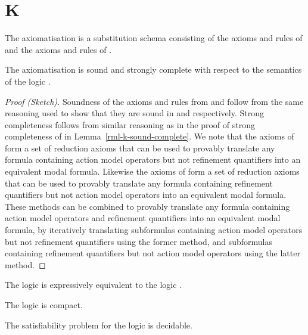 \section{K}

\begin{definition}
The axiomatisation \axiomAamlK{} is a substitution schema consisting of the axioms and rules of \axiomAmlK{} and the axioms and rules of \axiomRmlK{}.
\end{definition}

\begin{theorem}\label{aaml-k-sound-complete}
The axiomatisation \axiomRmlK{} is sound and strongly complete with respect to the semantics of the logic \logicAamlK{}.
\end{theorem}

\begin{proof}[Proof (Sketch)]
Soundness of the axioms and rules from \axiomAmlK{} and \axiomRmlK{} follow from the same reasoning used to show that they are sound in \logicAmlK{} and \logicRmlK{} respectively.
Strong completeness follows from similar reasoning as in the proof of strong completeness of \axiomRmlK{} in Lemma~\ref{rml-k-sound-complete}.
We note that the axioms of \axiomAmlK{} form a set of reduction axioms that can be used to provably translate any formula containing action model operators but not refinement quantifiers into an equivalent modal formula.
Likewise the axioms of \axiomRmlK{} form a set of reduction axioms that can be used to provably translate any formula containing refinement quantifiers but not action model operators into an equivalent modal formula.
These methods can be combined to provably translate any formula containing action model operators and refinement quantifiers into an equivalent modal formula, by iteratively translating subformulas containing action model operators but not refinement quantifiers using the former method, and subformulas containing refinement quantifiers but not action model operators using the latter method.
\end{proof}

\begin{corollary}
The logic \logicAamlK{} is expressively equivalent to the logic \logicK{}.
\end{corollary}

\begin{corollary}
The logic \logicAamlK{} is compact.
\end{corollary}

\begin{corollary}
The satisfiability problem for the logic \logicAamlK{} is decidable.
\end{corollary}

